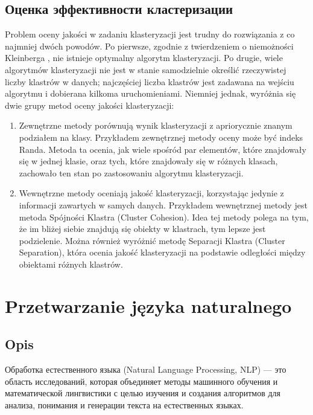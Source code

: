 	\subsection{Оценка эффективности кластеризации}
		Problem oceny jakości w zadaniu klasteryzacji jest trudny do rozwiązania z co najmniej dwóch powodów. Po pierwsze, zgodnie z twierdzeniem o niemożności Kleinberga \cite{Kleinberg}, nie istnieje optymalny algorytm klasteryzacji. Po drugie, wiele algorytmów klasteryzacji nie jest w stanie samodzielnie określić rzeczywistej liczby klastrów w danych; najczęściej liczba klastrów jest zadawana na wejściu algorytmu i dobierana kilkoma uruchomieniami.
		Niemniej jednak, wyróżnia się dwie grupy metod oceny jakości klasteryzacji:
		\begin{enumerate}
			\item Zewnętrzne metody porównują wynik klasteryzacji z apriorycznie znanym podziałem na klasy. Przykładem zewnętrznej metody oceny może być indeks Randa. Metoda ta ocenia, jak wiele spośród par elementów, które znajdowały się w jednej klasie, oraz tych, które znajdowały się w różnych klasach, zachowało ten stan po zastosowaniu algorytmu klasteryzacji.
			\item Wewnętrzne metody oceniają jakość klasteryzacji, korzystając jedynie z informacji zawartych w samych danych. Przykładem wewnętrznej metody jest metoda Spójności Klastra (Cluster Cohesion). Idea tej metody polega na tym, że im bliżej siebie znajdują się obiekty w klastrach, tym lepsze jest podzielenie. Można również wyróżnić metodę Separacji Klastra (Cluster Separation), która ocenia jakość klasteryzacji na podstawie odległości między obiektami różnych klastrów.
		\end{enumerate}


\section{Przetwarzanie języka naturalnego}

	\subsection{Opis}
		Обработка естественного языка (Natural Language Processing, NLP) — это область исследований, которая объединяет методы машинного обучения и математической лингвистики с целью изучения и создания алгоритмов для анализа, понимания и генерации текста на естественных языках. \cite{NLP}


